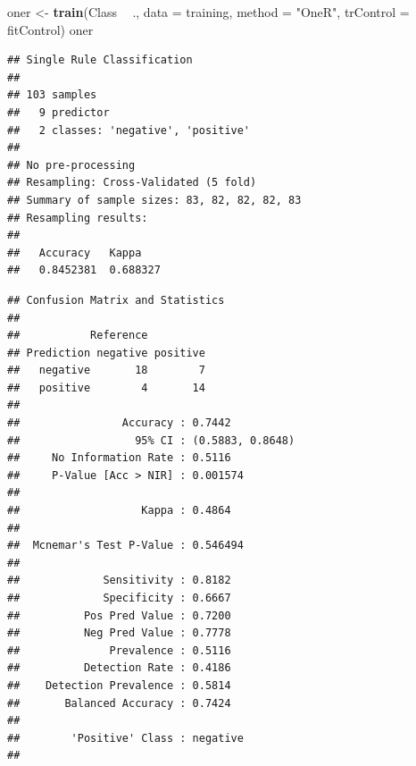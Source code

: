\documentclass[]{article}
\newenvironment{Shaded}{\begin{snugshade}}{\end{snugshade}}
\newcommand{\DataTypeTok}[1]{\textcolor[rgb]{0.13,0.29,0.53}{#1}}
\newcommand{\KeywordTok}[1]{\textcolor[rgb]{0.13,0.29,0.53}{\textbf{#1}}}
\newcommand{\NormalTok}[1]{#1}
\newcommand{\OperatorTok}[1]{\textcolor[rgb]{0.81,0.36,0.00}{\textbf{#1}}}
\newcommand{\StringTok}[1]{\textcolor[rgb]{0.31,0.60,0.02}{#1}}
\begin{document}
\begin{Shaded}
\begin{Highlighting}[]
\NormalTok{oner <-}\StringTok{ }\KeywordTok{train}\NormalTok{(Class }\OperatorTok{~}\StringTok{ }\NormalTok{., }\DataTypeTok{data =}\NormalTok{ training, }\DataTypeTok{method =} \StringTok{"OneR"}\NormalTok{, }\DataTypeTok{trControl =}\NormalTok{ fitControl)}
\NormalTok{oner}
\end{Highlighting}
\end{Shaded}

\begin{verbatim}
## Single Rule Classification 
## 
## 103 samples
##   9 predictor
##   2 classes: 'negative', 'positive' 
## 
## No pre-processing
## Resampling: Cross-Validated (5 fold) 
## Summary of sample sizes: 83, 82, 82, 82, 83 
## Resampling results:
## 
##   Accuracy   Kappa   
##   0.8452381  0.688327
\end{verbatim}

\begin{Shaded}
\end{Shaded}

\newpage

\begin{verbatim}
## Confusion Matrix and Statistics
## 
##           Reference
## Prediction negative positive
##   negative       18        7
##   positive        4       14
##                                           
##                Accuracy : 0.7442          
##                  95% CI : (0.5883, 0.8648)
##     No Information Rate : 0.5116          
##     P-Value [Acc > NIR] : 0.001574        
##                                           
##                   Kappa : 0.4864          
##                                           
##  Mcnemar's Test P-Value : 0.546494        
##                                           
##             Sensitivity : 0.8182          
##             Specificity : 0.6667          
##          Pos Pred Value : 0.7200          
##          Neg Pred Value : 0.7778          
##              Prevalence : 0.5116          
##          Detection Rate : 0.4186          
##    Detection Prevalence : 0.5814          
##       Balanced Accuracy : 0.7424          
##                                           
##        'Positive' Class : negative        
## 
\end{verbatim}
\end{document}
